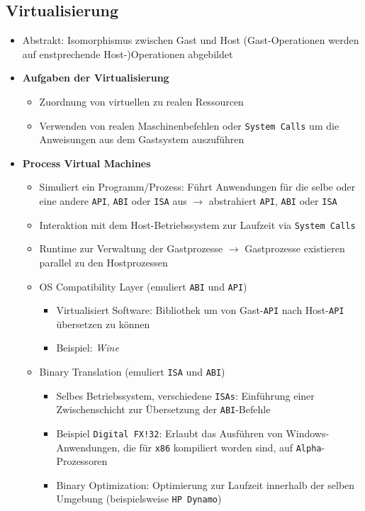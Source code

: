 \subsection{Virtualisierung}
\begin{itemize}
	\item Abstrakt: Isomorphismus zwischen Gast und Host (Gast-Operationen werden auf enstprechende Host-)Operationen abgebildet
	\item \textbf{Aufgaben der Virtualisierung}
	\begin{itemize}
		\item Zuordnung von virtuellen zu realen Ressourcen
		\item Verwenden von realen Maschinenbefehlen oder \texttt{System Calls} um die Anweisungen aus dem Gastsystem auszuführen
	\end{itemize}
	\item \textbf{Process Virtual Machines}
	\begin{itemize}
		\item Simuliert ein Programm/Prozess: Führt Anwendungen für die selbe oder eine andere \texttt{API}, \texttt{ABI} oder \texttt{ISA} aus \(\rightarrow\) abstrahiert \texttt{API}, \texttt{ABI} oder \texttt{ISA}
		\item Interaktion mit dem Host-Betriebssystem zur Laufzeit via \texttt{System Calls}
		\item Runtime zur Verwaltung der Gastprozesse \(\rightarrow\) Gastprozesse existieren parallel zu den Hostprozessen
		\item OS Compatibility Layer (emuliert \texttt{ABI} und \texttt{API})
		\begin{itemize}
			\item Virtualisiert Software: Bibliothek um von Gast-\texttt{API} nach Host-\texttt{API} übersetzen zu können
			\item Beispiel: \textit{Wine}
		\end{itemize}
		\item Binary Translation (emuliert \texttt{ISA} und \texttt{ABI})
		\begin{itemize}
			\item Selbes Betriebssystem, verschiedene \texttt{ISAs}: Einführung einer Zwischenschicht zur Übersetzung der \texttt{ABI}-Befehle
			\item Beispiel \texttt{Digital FX!32}: Erlaubt das Ausführen von Windows-Anwendungen, die für \texttt{x86} kompiliert worden sind, auf \texttt{Alpha}-Prozessoren
			\item Binary Optimization: Optimierung zur Laufzeit innerhalb der selben Umgebung (beispielsweise \texttt{HP Dynamo})

\end{itemize}
\end{itemize}
\end{itemize}
